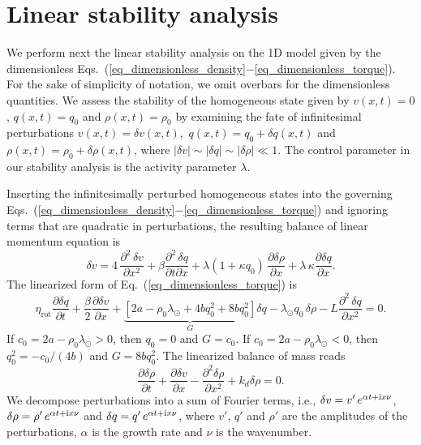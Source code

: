 \pagebreak
\section{Linear stability analysis} \label{appendix_1_sec_6}

We perform next the linear stability analysis on the 1D model given by the dimensionless Eqs.~(\ref{eq_dimensionless_density}$-$\ref{eq_dimensionless_torque}). For the sake of simplicity of notation, we omit overbars for the dimensionless quantities. We assess the stability of the homogeneous state given by $v(x,t)=0$, $q(x,t) = q_0$ and  $\rho(x,t) = \rho_0$ by examining the fate of infinitesimal perturbations $v \left(x,t\right)=\delta  v \left(x,t\right)$,  $ \, q \left(x,t\right) =q_0 + \delta q \left(x,t\right) $ and $\rho \left(x,t\right)=\rho_0 + \delta \rho \left(x,t\right)$, where  $\left\vert \delta  v \right \vert  \sim \left \vert \delta q \right \vert \sim \left \vert \delta \rho \right \vert \ll1 $. The control parameter in our stability analysis is the activity parameter $\lambda$.

Inserting the infinitesimally perturbed homogeneous states into the governing Eqs.~(\ref{eq_dimensionless_density}$-$\ref{eq_dimensionless_torque}) and ignoring terms that are quadratic in perturbations, the resulting balance of linear momentum equation is
\begin{equation} \label{eq_linearized_force}
	\delta v =  4 \, \frac{\partial^2 \, \delta v}{\partial x^2} + \beta  \frac{\partial^2\, \delta {q}}{\partial t \partial x} + \lambda(1 + \kappa q_0 )   \,\frac{\partial \delta \rho}{\partial x}
	+ \lambda \,  \kappa  \frac{\partial \delta q}{\partial x}.
\end{equation}
The linearized form of Eq.~(\ref{eq_dimensionless_torque}) is
\begin{equation} \label{eq_linearized_torque_density}
	\eta_{\text{rot}}  \frac{\partial \delta q}{\partial t} + \frac{\beta}{2} \frac{\partial \delta v}{\partial x} + \underbrace{\left[2a-\rho_0\lambda_\odot + 4bq_0^2 + 8 b q_0^2\right]}_{G} \delta q -  \lambda_{\odot} q_0 \, \delta \rho  - L \frac{\partial^2 \, \delta  q}{\partial x^2}   = 0.
\end{equation}
If $c_0 = 2a - \rho_0 \lambda_\odot>0$, then $q_0 = 0$ and $G = c_0$. If $c_0 = 2a - \rho_0 \lambda_\odot<0$, then $q_0^2 = -c_0/(4b)$ and $G=8 b q_0^2$. The linearized balance of mass reads
\begin{equation} \label{eq_linearized_mass}
	\frac{\partial  \delta \rho }{\partial t} + \frac{\partial \delta v}{\partial x} -  \frac{\partial^2 \delta \rho}{\partial x^2}  + k_d \delta \rho=0.
\end{equation}
We decompose perturbations into a sum of Fourier terms, i.e., $\delta v = v' \,  e^{\alpha t + \mathrm{i} x\nu}$, $\delta \rho = \rho' \, e^{\alpha t + \mathrm{i} x\nu}$ and $\delta q = q' \,  e^{\alpha t + \mathrm{i} x\nu}$, where $v'$, $q'$ and $\rho'$ are the amplitudes of the perturbations, $\alpha$ is the growth rate and $\nu$ is the  wavenumber.


